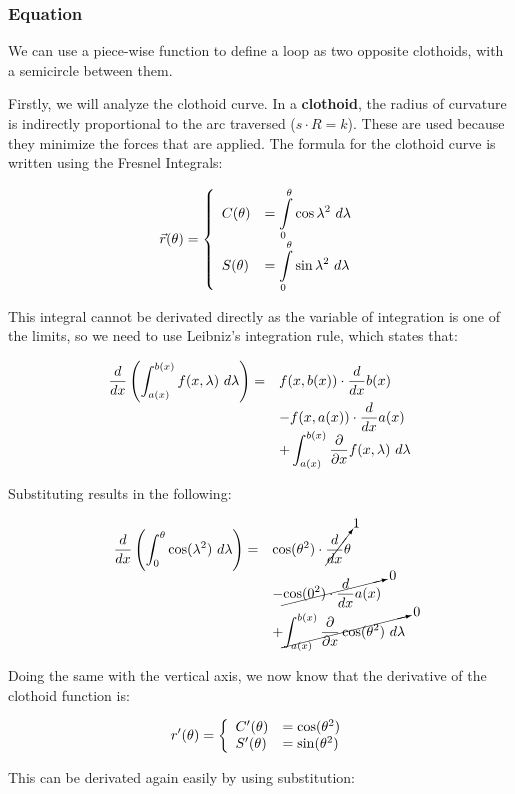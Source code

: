 \documentclass[12pt,twoside,a4paper]{article}
\newcommand{\ds}{\displaystyle}
\begin{document}
	\subsubsection{Equation}
	We can use a piece-wise function to define a loop as two opposite clothoids, with a semicircle between them.
	
	Firstly, we will analyze the clothoid curve. In a \textbf{clothoid}, the radius of curvature is indirectly proportional to the arc traversed ($s \cdot R = k$). These are used because they minimize the forces that are applied. The formula for the clothoid curve is written using the Fresnel Integrals:
	
	$$\vec{r}(\theta) = \left\{\begin{array}{ll} C(\theta) &= \ds \intop_0^\theta{\cos{\lambda^2}} \ d\lambda \cr S(\theta) &= \ds \intop_0^\theta{\sin{\lambda^2}} \ d\lambda \end {array}\right.$$
	
	This integral cannot be derivated directly as the variable of integration is one of the limits, so we need to use Leibniz's integration rule, which states that:
	
	$$\begin{array}{rl}
		\ds \frac{d}{dx} \left(\int_{a(x)}^{b(x)} f(x, \lambda)\ d\lambda\right) =& \ds f(x, b(x)) \cdot \frac{d}{dx}b(x) \cr
		& \ds - f(x, a(x)) \cdot \frac{d}{dx}a(x) \cr
		& \ds + \int_{a(x)}^{b(x)} \frac{\partial}{\partial x}f(x, \lambda)\ d\lambda
	\end{array}$$

	Substituting results in the following:
	
	$$\begin{array}{rl}
		\ds \frac{d}{dx} \left(\int_{0}^{\theta} \cos(\lambda^2)\ d\lambda\right) =& \ds \cos(\theta^2) \cdot \cancelto{1}{\frac{d}{dx}\theta} \cr
		& \ds - \cancelto{0}{\cos(0^2) \cdot \frac{d}{dx}a(x)} \cr
		& \ds + \cancelto{0}{\int_{a(x)}^{b(x)} \frac{\partial}{\partial x} \cos(\theta^2) \ d\lambda}
	\end{array}$$
	
	Doing the same with the vertical axis, we now know that the derivative of the clothoid function is:
	
	$$r'(\theta) = \left\{\begin{array}{ll} C'(\theta) &= \cos(\theta^2) \cr S'(\theta) &= \sin(\theta^2) \end{array}\right.$$
	
	This can be derivated again easily by using substitution:
	
\end{document}
